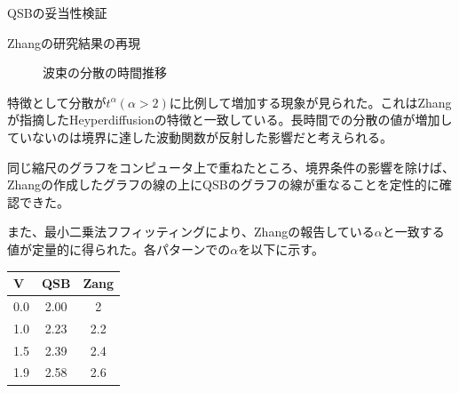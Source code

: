 \documentclass[a4paper, lualatex]{bxjsarticle}
\begin{document}
\begin{section}{QSBの妥当性検証}
\begin{subsection}{Zhangの研究結果の再現}
\begin{figure}[h]
            \caption{波束の分散の時間推移}
        \end{figure}
        \par 特徴として分散が$t^\alpha(\alpha>2)$に比例して増加する現象が見られた。これはZhangが指摘したHeyperdiffusionの特徴と一致している。長時間での分散の値が増加していないのは境界に達した波動関数が反射した影響だと考えられる。
        \par 同じ縮尺のグラフをコンピュータ上で重ねたところ、境界条件の影響を除けば、Zhangの作成したグラフの線の上にQSBのグラフの線が重なることを定性的に確認できた。
        \par また、最小二乗法フフィッティングにより、Zhangの報告している$\alpha$と一致する値が定量的に得られた。各パターンでの$\alpha$を以下に示す。
        \begin{table}[h]
            \begin{tabular}{lcc}
                V&QSB & Zang\\ \hline
                0.0&2.00&2\\
                1.0&2.23&2.2\\
                1.5&2.39&2.4\\
                1.9&2.58&2.6
            \end{tabular}
        \end{table}
    \end{subsection}
\end{section}
\end{document}
